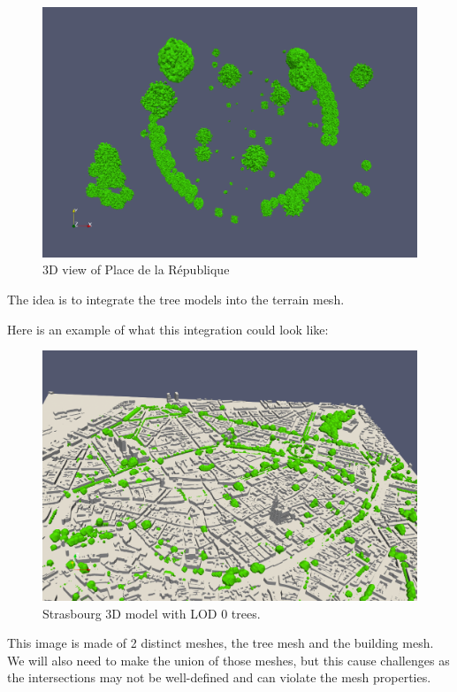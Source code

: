 \documentclass[12pt]{article}
\begin{document}
\begin{figure}[H]
        \centering
        \includegraphics[width=\textwidth]{images/republic_lod3.png}
        \caption{3D view of Place de la République}
\end{figure}

The idea is to integrate the tree models into the terrain mesh.

Here is an example of what this integration could look like:

\begin{figure}[H]
    \centering
    \includegraphics[width=1\textwidth]{images/stras_lod0.png}
    \caption{Strasbourg 3D model with LOD 0 trees.}
\end{figure}

This image is made of 2 distinct meshes, the tree mesh and the building mesh.
We will also need to make the union of those meshes, but this cause challenges 
as the intersections may not be well-defined and can violate the mesh properties.
\end{document}

